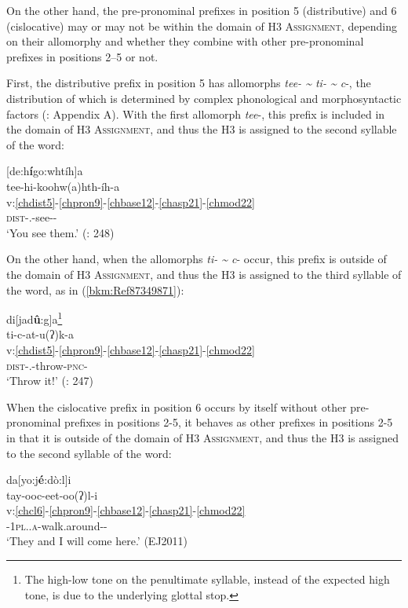 \documentclass[output=paper]{langscibook}
\begin{document}
On the other hand, the pre-pronominal prefixes in position 5 (distributive) and 6 (cislocative) may or may not be within the domain of H3 \textsc{Assignment}, depending on their allomorphy and whether they combine with other pre-pronominal prefixes in positions {2--5} or not. 

First, the distributive prefix in position 5 has allomorphs \textit{tee- {\textasciitilde} ti- {\textasciitilde} c}{}-, the distribution of which is determined by complex phonological and morphosyntactic factors (\citealt{uchihara2016tone}: Appendix A). With the first allomorph \textit{tee}{}-, this prefix is included in the domain of H3 \textsc{Assignment}, and thus the H3 is assigned to the second syllable of the word:

 \ea\label{ex:cher:key:20} {[de:h\textbf{í}go:whtíh]a} \\
\glll tee-hi-koohw(a)hth-íh-a\\
v:\ref{chdist5}-\ref{chpron9}-\ref{chbase12}-\ref{chasp21}-\ref{chmod22} \\
\textsc{dist}-\Second\Sg.\Aarg{}-see-\Prs{}-\Ind{}\\
\glt `You see them.' (\citealt{PulteFeeling1975}: 248)
\z 


On the other hand, when the allomorphs \textit{ti- {\textasciitilde} c}{}- occur, this prefix is outside of the domain of H3 \textsc{Assignment,} and thus the H3 is assigned to the third syllable of the word, as in (\ref{bkm:Ref87349871}):

\ea\label{bkm:Ref87349871}di[jad\textbf{û}:g]a\footnote{The high-low tone on the penultimate syllable, instead of the expected high tone, is due to the underlying glottal stop.}  \\
\glll ti-c-at-u(ʔ)k-a\\
v:\ref{chdist5}-\ref{chpron9}-\ref{chbase12}-\ref{chasp21}-\ref{chmod22} \\
\textsc{dist}-\Second\Sg.\Barg{}-throw-\textsc{pnc}-\Ind{}\\ 
\glt `Throw it!' (\citealt{PulteFeeling1975}: 247)
\z 


When the cislocative prefix in position 6 occurs by itself without other pre-pronominal prefixes in positions 2-5, it behaves as other prefixes in positions  2-5  in that it is outside of the domain of H3 \textsc{Assignment}, and thus the H3 is assigned to the second syllable of the word:

\newpage
\ea\label{ex:cher:key:22} {da[yo:j\textbf{é}:dò:l]i} \\
\glll tay-ooc-eet-oo(ʔ)l-i\\
v:\ref{chcl6}-\ref{chpron9}-\ref{chbase12}-\ref{chasp21}-\ref{chmod22} \\ 
\Cisl{}-\textsc{1pl.\Excl.a}{}-walk.around-\Prf{}-\Mot{}\\
\glt `They and I will come here.' (EJ2011)
\z 
\end{document}
